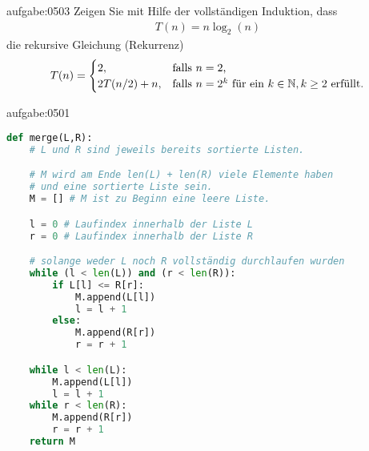 \begin{aufgabe}{aufgabe:0503}
Zeigen Sie mit Hilfe der vollständigen Induktion, dass
\begin{align*}
    T(n) = n\log_2(n)
\end{align*}
die rekursive Gleichung (Rekurrenz)
\[
  T(n) = 
  \begin{cases}
    2, &\text{falls $n = 2$,} \\
    2T(n/2) + n, & \text{falls $n = 2^k$ für ein $k\in\mathbb{N}, k\geq 2$ erfüllt.}
  \end{cases}
\]
\end{aufgabe}

\begin{comment}
\section{\textit{merge sort} ist optimal}
Es lässt sich relativ leicht beweisen, dass \textit{merge sort} in einem gewissen Sinne eine optimaler (was die Laufzeit betrifft) Sortieralgorithmus ist. Dies ist einer der Gründe, warum der \textit{merge sort} Algorithmus in Schulen und Universitäten gerne untersucht wird. Was meinen wir mit \enquote{in einem gewissen Sinne}? Ein Sortieralgorithmus wird ein (reiner) \textit{vergleichsbasierter} Sortieralgorithmus genannt, falls der Algorithmus lediglich Vergleiche der Form $\leq$ verwendet, um Informationen über die Reihenfolge der zu sortierenden Elemente zu gewinnen. Wir wollen beweisen, dass jeder vergleichsbasiertere Sortieralgorithmus mindestens $n\log(n)$ Vergleiche benötigt, um $n$ Elemente zu sortieren. In diesem Abschnitt nehmen wir an, dass alle zu sortierenden Elemente unterschiedlich sind (ohne Beschränkung der Allgemeinheit).

Wir können die Arbeit vergleichsbasierter Sortieralgorithmen durch binäre Entscheidungsbäume illustrieren. 
\end{comment}


\begin{antwort}{aufgabe:0501}
\begin{lstlisting}[language=Python,caption=Implementation der Funktion \pythoninline{merge},label=listing:merge]
def merge(L,R):
    # L und R sind jeweils bereits sortierte Listen.

    # M wird am Ende len(L) + len(R) viele Elemente haben
    # und eine sortierte Liste sein.
    M = [] # M ist zu Beginn eine leere Liste.

    l = 0 # Laufindex innerhalb der Liste L
    r = 0 # Laufindex innerhalb der Liste R

    # solange weder L noch R vollständig durchlaufen wurden
    while (l < len(L)) and (r < len(R)):
        if L[l] <= R[r]:
            M.append(L[l])
            l = l + 1
        else:
            M.append(R[r])
            r = r + 1

    while l < len(L):
        M.append(L[l])
        l = l + 1
    while r < len(R):
        M.append(R[r])
        r = r + 1
    return M
\end{lstlisting}     
\end{antwort}


